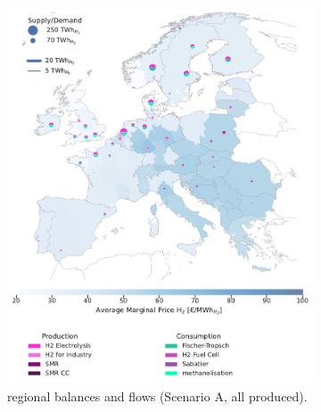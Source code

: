 \documentclass[final,5p,times,twocolumn]{elsarticle}
\begin{document}
\begin{figure}[!htbp]
  \centering
  \begin{subfigure}[t]{0.47\textwidth}
      \vspace{0pt}
      \includegraphics[width=\textwidth]{balance_map_h2_scenario_a}
      \vspace{0.3cm}
      \vspace{-0.3cm}
      \caption{ regional balances and flows (Scenario A, all  produced).}
      \label{fig:balance_map_h2_scenario_a}
  \end{subfigure}
  \hfill
  \begin{subfigure}[t]{0.47\textwidth}
      \vspace{0pt}

\end{subfigure}
\end{figure}
\end{document}
